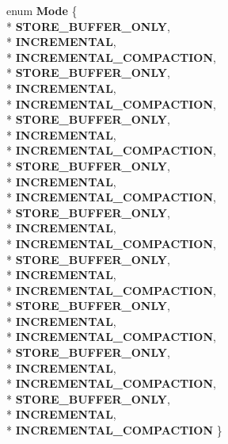 \begin{DoxyCompactItemize}
\item 
enum {\bfseries Mode} \{ \\*
{\bfseries S\+T\+O\+R\+E\+\_\+\+B\+U\+F\+F\+E\+R\+\_\+\+O\+N\+LY}, 
\\*
{\bfseries I\+N\+C\+R\+E\+M\+E\+N\+T\+AL}, 
\\*
{\bfseries I\+N\+C\+R\+E\+M\+E\+N\+T\+A\+L\+\_\+\+C\+O\+M\+P\+A\+C\+T\+I\+ON}, 
\\*
{\bfseries S\+T\+O\+R\+E\+\_\+\+B\+U\+F\+F\+E\+R\+\_\+\+O\+N\+LY}, 
\\*
{\bfseries I\+N\+C\+R\+E\+M\+E\+N\+T\+AL}, 
\\*
{\bfseries I\+N\+C\+R\+E\+M\+E\+N\+T\+A\+L\+\_\+\+C\+O\+M\+P\+A\+C\+T\+I\+ON}, 
\\*
{\bfseries S\+T\+O\+R\+E\+\_\+\+B\+U\+F\+F\+E\+R\+\_\+\+O\+N\+LY}, 
\\*
{\bfseries I\+N\+C\+R\+E\+M\+E\+N\+T\+AL}, 
\\*
{\bfseries I\+N\+C\+R\+E\+M\+E\+N\+T\+A\+L\+\_\+\+C\+O\+M\+P\+A\+C\+T\+I\+ON}, 
\\*
{\bfseries S\+T\+O\+R\+E\+\_\+\+B\+U\+F\+F\+E\+R\+\_\+\+O\+N\+LY}, 
\\*
{\bfseries I\+N\+C\+R\+E\+M\+E\+N\+T\+AL}, 
\\*
{\bfseries I\+N\+C\+R\+E\+M\+E\+N\+T\+A\+L\+\_\+\+C\+O\+M\+P\+A\+C\+T\+I\+ON}, 
\\*
{\bfseries S\+T\+O\+R\+E\+\_\+\+B\+U\+F\+F\+E\+R\+\_\+\+O\+N\+LY}, 
\\*
{\bfseries I\+N\+C\+R\+E\+M\+E\+N\+T\+AL}, 
\\*
{\bfseries I\+N\+C\+R\+E\+M\+E\+N\+T\+A\+L\+\_\+\+C\+O\+M\+P\+A\+C\+T\+I\+ON}, 
\\*
{\bfseries S\+T\+O\+R\+E\+\_\+\+B\+U\+F\+F\+E\+R\+\_\+\+O\+N\+LY}, 
\\*
{\bfseries I\+N\+C\+R\+E\+M\+E\+N\+T\+AL}, 
\\*
{\bfseries I\+N\+C\+R\+E\+M\+E\+N\+T\+A\+L\+\_\+\+C\+O\+M\+P\+A\+C\+T\+I\+ON}, 
\\*
{\bfseries S\+T\+O\+R\+E\+\_\+\+B\+U\+F\+F\+E\+R\+\_\+\+O\+N\+LY}, 
\\*
{\bfseries I\+N\+C\+R\+E\+M\+E\+N\+T\+AL}, 
\\*
{\bfseries I\+N\+C\+R\+E\+M\+E\+N\+T\+A\+L\+\_\+\+C\+O\+M\+P\+A\+C\+T\+I\+ON}, 
\\*
{\bfseries S\+T\+O\+R\+E\+\_\+\+B\+U\+F\+F\+E\+R\+\_\+\+O\+N\+LY}, 
\\*
{\bfseries I\+N\+C\+R\+E\+M\+E\+N\+T\+AL}, 
\\*
{\bfseries I\+N\+C\+R\+E\+M\+E\+N\+T\+A\+L\+\_\+\+C\+O\+M\+P\+A\+C\+T\+I\+ON}, 
\\*
{\bfseries S\+T\+O\+R\+E\+\_\+\+B\+U\+F\+F\+E\+R\+\_\+\+O\+N\+LY}, 
\\*
{\bfseries I\+N\+C\+R\+E\+M\+E\+N\+T\+AL}, 
\\*
{\bfseries I\+N\+C\+R\+E\+M\+E\+N\+T\+A\+L\+\_\+\+C\+O\+M\+P\+A\+C\+T\+I\+ON}
 \}\hypertarget{classv8_1_1internal_1_1_record_write_stub_adaa3c49c2efe74f9d635fc17eb76aabe}{}\label{classv8_1_1internal_1_1_record_write_stub_adaa3c49c2efe74f9d635fc17eb76aabe}


\end{DoxyCompactItemize}
